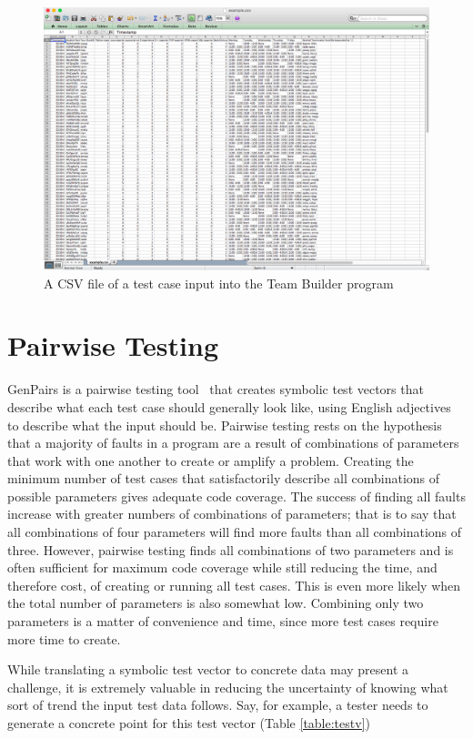 \begin{figure}
\includegraphics[scale=0.3]{team-file.png}
\caption{A CSV file of a test case input into the Team Builder program}
\label{fig:teamfile}
\end{figure}

\section{Pairwise Testing}
GenPairs is a pairwise testing tool~\cite{Gen:Pairs} that creates symbolic test vectors that describe what each test case should generally look like, using English adjectives to describe what the input should be. Pairwise testing rests on the hypothesis that a majority of faults in a program are a result of combinations of parameters that work with one another to create or amplify a problem. Creating the minimum number of test cases that satisfactorily describe all combinations of possible parameters gives adequate code coverage. The success of finding all faults increase with greater numbers of combinations of parameters; that is to say that all combinations of four parameters will find more faults than all combinations of three. However, pairwise testing finds all combinations of two parameters and is often sufficient for maximum code coverage while still reducing the time, and therefore cost, of creating or running all test cases. This is even more likely when the total number of parameters is also somewhat low. Combining only two parameters is a matter of convenience and time, since more test cases require more time to create.

While translating a symbolic test vector to concrete data may present a challenge, it is extremely valuable in reducing the uncertainty of knowing what sort of trend the input test data follows. Say, for example, a tester needs to generate a concrete point for this test vector (Table \ref{table:testv})

